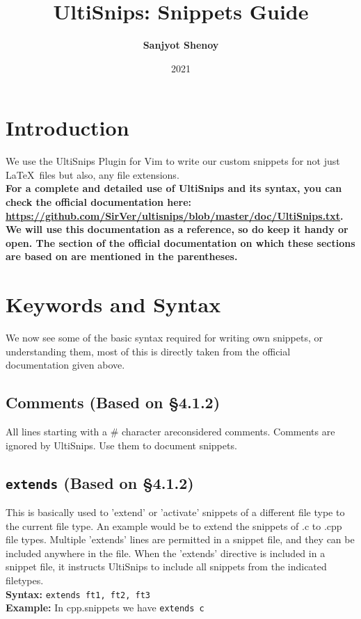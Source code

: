 \documentclass[11pt]{article}
\title{UltiSnips: Snippets Guide}
\author{\textbf{Sanjyot Shenoy}}
\date{2021}
\theoremstyle{plain}%
\theoremstyle{definition}
\theoremstyle{remark}
\begin{document}
	\maketitle
	\tableofcontents
	\section{Introduction}
	We use the UltiSnips Plugin for Vim to write our custom snippets for not just \LaTeX\, files but also, any file extensions. \\
	\textbf{For a complete and detailed use of UltiSnips and its syntax, you can check the official documentation here: \\
	\url{https://github.com/SirVer/ultisnips/blob/master/doc/UltiSnips.txt}.\\ 
	We will use this documentation as a reference, so do keep it handy or open. The section of the official documentation on which these sections are based on are mentioned in the parentheses.}
	\section{Keywords and Syntax}
	We now see some of the basic syntax required for writing own snippets, or understanding them, most of this is directly taken from the official documentation given above. 
	\subsection{Comments (Based on \S4.1.2)}
	All lines starting with a \# character areconsidered comments. Comments are ignored by UltiSnips. Use them to document snippets.
	\subsection{\texttt{extends} (Based on \S4.1.2)}
	This is basically used to 'extend' or 'activate' snippets of a different file type to the current file type. An example would be to extend the snippets of .c to .cpp file types. Multiple 'extends' lines are permitted in a snippet file, and they can be included anywhere in the file. When the 'extends' directive is included in a snippet file, it instructs UltiSnips to include all snippets from the indicated filetypes. \\
	\textbf{Syntax:} \texttt{extends ft1, ft2, ft3}\\
	\textbf{Example:} In cpp.snippets we have \texttt{extends c}
\end{document}
